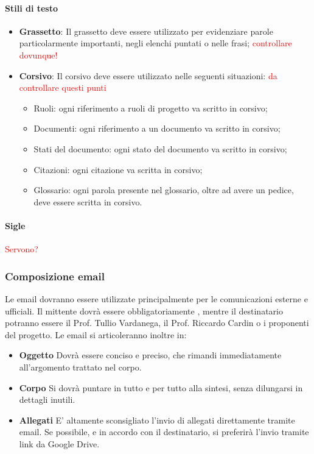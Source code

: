 \paragraph{Stili di testo}
\begin{itemize}
	\item \textbf{Grassetto}: Il grassetto deve essere utilizzato per evidenziare parole
	particolarmente importanti, negli elenchi puntati o nelle frasi; \textcolor{red}{controllare dovunque!}
	\item \textbf{Corsivo}: Il corsivo deve essere utilizzato nelle seguenti
	situazioni: \textcolor{red}{da controllare questi punti}
	\begin{itemize}
		\item Ruoli: ogni riferimento a ruoli di progetto va scritto in corsivo;
		\item Documenti: ogni riferimento a un documento va scritto in corsivo;
		\item Stati del documento: ogni stato del documento va scritto in corsivo;
		\item Citazioni: ogni citazione va scritta in corsivo;
		\item Glossario: ogni parola presente nel glossario, oltre ad avere un pedice, deve
		essere scritta in corsivo.
	\end{itemize}
\end{itemize}
\paragraph{Sigle}
\textcolor{red}{Servono?}
\subsubsection{Composizione email}
Le email dovranno essere utilizzate principalmente per le comunicazioni esterne e ufficiali. Il mittente dovrà essere obbligatoriamente \indirizzo,
mentre il destinatario potranno essere il Prof. Tullio Vardanega, il Prof. Riccardo Cardin o i proponenti del progetto. Le email si articoleranno inoltre in:
\begin{itemize}
	\item \textbf{Oggetto}
	Dovrà essere conciso e preciso, che rimandi immediatamente all'argomento trattato nel corpo.
	\item \textbf{Corpo}
	Si dovrà puntare in tutto e per tutto alla sintesi, senza dilungarsi in dettagli inutili.
	\item \textbf{Allegati}
	E' altamente sconsigliato l'invio di allegati direttamente tramite email. Se possibile, e in accordo con il destinatario, si preferirà l'invio tramite link da Google Drive.
\end{itemize} 

